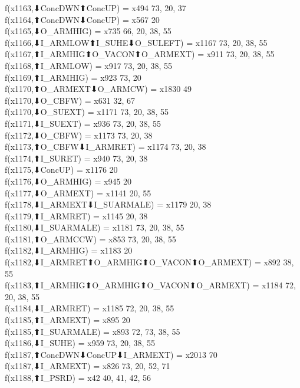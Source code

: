 f(x1163,⬇ConcDWN⬆ConcUP) = x494 {73, 20, 37} \\
f(x1164,⬆ConcDWN⬇ConcUP) = x567 {20} \\
f(x1165,⬇O_ARMHIG) = x735 {66, 20, 38, 55} \\
f(x1166,⬇I_ARMLOW⬆I_SUHE⬇O_SULEFT) = x1167 {73, 20, 38, 55} \\
f(x1167,⬆I_ARMHIG⬆O_VACON⬆O_ARMEXT) = x911 {73, 20, 38, 55} \\
f(x1168,⬆I_ARMLOW) = x917 {73, 20, 38, 55} \\
f(x1169,⬆I_ARMHIG) = x923 {73, 20} \\
f(x1170,⬆O_ARMEXT⬇O_ARMCW) = x1830 {49} \\
f(x1170,⬇O_CBFW) = x631 {32, 67} \\
f(x1170,⬇O_SUEXT) = x1171 {73, 20, 38, 55} \\
f(x1171,⬇I_SUEXT) = x936 {73, 20, 38, 55} \\
f(x1172,⬇O_CBFW) = x1173 {73, 20, 38} \\
f(x1173,⬆O_CBFW⬇I_ARMRET) = x1174 {73, 20, 38} \\
f(x1174,⬆I_SURET) = x940 {73, 20, 38} \\
f(x1175,⬇ConcUP) = x1176 {20} \\
f(x1176,⬇O_ARMHIG) = x945 {20} \\
f(x1177,⬇O_ARMEXT) = x1141 {20, 55} \\
f(x1178,⬇I_ARMEXT⬇I_SUARMALE) = x1179 {20, 38} \\
f(x1179,⬆I_ARMRET) = x1145 {20, 38} \\
f(x1180,⬇I_SUARMALE) = x1181 {73, 20, 38, 55} \\
f(x1181,⬆O_ARMCCW) = x853 {73, 20, 38, 55} \\
f(x1182,⬇I_ARMHIG) = x1183 {20} \\
f(x1182,⬇I_ARMRET⬆O_ARMHIG⬆O_VACON⬆O_ARMEXT) = x892 {38, 55} \\
f(x1183,⬆I_ARMHIG⬆O_ARMHIG⬆O_VACON⬆O_ARMEXT) = x1184 {72, 20, 38, 55} \\
f(x1184,⬇I_ARMRET) = x1185 {72, 20, 38, 55} \\
f(x1185,⬆I_ARMEXT) = x895 {20} \\
f(x1185,⬆I_SUARMALE) = x893 {72, 73, 38, 55} \\
f(x1186,⬇I_SUHE) = x959 {73, 20, 38, 55} \\
f(x1187,⬆ConcDWN⬇ConcUP⬇I_ARMEXT) = x2013 {70} \\
f(x1187,⬇I_ARMEXT) = x826 {73, 20, 52, 71} \\
f(x1188,⬆I_PSRD) = x42 {40, 41, 42, 56} \\
